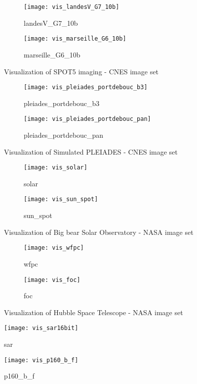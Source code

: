 \begin{figure}[tb]
  \begin{subfigure}[b]{0.25\textwidth}
    \texttt{[image: vis\_landesV\_G7\_10b]}
    \caption{landesV\_G7\_10b}
    \label{fig:landesV_G7_10b}
  \end{subfigure}
  \quad
  \quad
  \quad
  \quad
  \quad
  \quad
  \begin{subfigure}[b]{0.25\textwidth}
    \texttt{[image: vis\_marseille\_G6\_10b]}
    \caption{marseille\_G6\_10b}
    \label{fig:marseille_G6_10b}
  \end{subfigure}
\caption{Visualization of SPOT5 imaging - \gls{CNES} image set}
\label{img:refimgspot5}
\end{figure}

\begin{figure}[tb]
  \begin{subfigure}[b]{0.48\textwidth}
    \texttt{[image: vis\_pleiades\_portdebouc\_b3]}
    \caption{pleiades\_portdebouc\_b3}
    \label{fig:pleiades_portdebouc_b3}
  \end{subfigure}
  \quad
  \quad
  \quad
  \quad
  \begin{subfigure}[b]{0.28\textwidth}
    \texttt{[image: vis\_pleiades\_portdebouc\_pan]}
    \caption{pleiades\_portdebouc\_pan}
    \label{fig:pleiades_portdebouc_pan}
  \end{subfigure}
\caption{Visualization of Simulated PLEIADES - \gls{CNES} image set}
\label{img:refimgpleiades}
\end{figure}

\begin{figure}[tb]
  \begin{subfigure}[b]{0.48\textwidth}
    \texttt{[image: vis\_solar]}
    \caption{solar}
    \label{fig:solar}
  \end{subfigure}
  \quad
  \begin{subfigure}[b]{0.48\textwidth}
    \texttt{[image: vis\_sun\_spot]}
    \caption{sun\_spot}
    \label{fig:sun_spot}
  \end{subfigure}
\caption{Visualization of Big bear Solar Observatory - \gls{NASA} image set}
\label{img:refimgbigbear}
\end{figure}

\begin{figure}[tb]
  \begin{subfigure}[b]{0.4\textwidth}
    \texttt{[image: vis\_wfpc]}
    \caption{wfpc}
    \label{fig:wfpc}
  \end{subfigure}
  \quad
  \begin{subfigure}[b]{0.5\textwidth}
    \texttt{[image: vis\_foc]}
    \caption{foc}
    \label{fig:foc}
  \end{subfigure}
\caption{Visualization of Hubble Space Telescope - \gls{NASA} image set}
\label{img:refimghubble}
\end{figure}

\begin{figure}[tb]
    \texttt{[image: vis\_sar16bit]}
    \caption{sar}
    \label{fig:sar}
\end{figure}

\begin{figure}[tb]
    \texttt{[image: vis\_p160\_b\_f]}
    \caption{p160\_b\_f}
    \label{fig:p160_b_f}
\end{figure}



